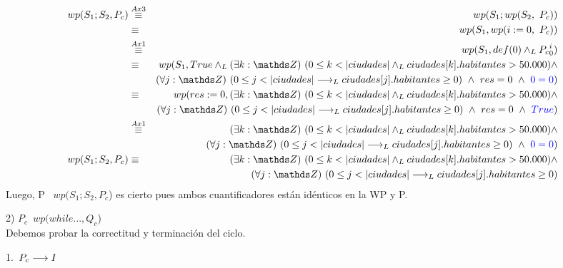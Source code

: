 \documentclass[10pt,a4paper,fleqn]{article}
\begin{document}
\begin{eqnarray}
    wp(S_1;S_2, P_c) &\overset{Ax3}{\equiv}& wp(S_1; wp(S_2,\ P_c))  \notag \\
    &\equiv& wp(S_1, wp(i:=0,\ P_c)) \notag \\
    &\overset{Ax1}{\equiv}& wp(S_1, def(0) \yLuego \text{$P_c$}_{0}^{i}) \notag \\
    &\equiv& wp(S_1, True \yLuego \existe[unalinea]{k}{\ent}{0 \leq k< |ciudades| \yLuego ciudades[k].habitantes >  50.000 }\land \notag \\ & & \paraTodo[unalinea]{j}{\ent}{0\leq j < |ciudades| \implicaLuego ciudades[j].habitantes \geq 0}\ \land \ res=0\ \land \ \textcolor{blue}{0=0}) \notag \\
     &\equiv& wp(res:= 0, \existe[unalinea]{k}{\ent}{0 \leq k< |ciudades| \yLuego ciudades[k].habitantes >  50.000 }\land \notag \\ & & \paraTodo[unalinea]{j}{\ent}{0\leq j < |ciudades| \implicaLuego ciudades[j].habitantes \geq 0}\ \land \ res=0\ \land \ \textcolor{blue}{True}) \notag \\
     &\overset{Ax1}{\equiv}& \existe[unalinea]{k}{\ent}{0 \leq k< |ciudades| \yLuego ciudades[k].habitantes >  50.000 }\land \notag \\ & & \paraTodo[unalinea]{j}{\ent}{0\leq j < |ciudades| \implicaLuego ciudades[j].habitantes \geq 0}\ \land \ \textcolor{blue}{0=0}) \notag \\
       wp(S_1;S_2, P_c) &\equiv& \existe[unalinea]{k}{\ent}{0 \leq k< |ciudades| \yLuego ciudades[k].habitantes >  50.000 }\land \notag \\ & & \paraTodo[unalinea]{j}{\ent}{0\leq j < |ciudades| \implicaLuego ciudades[j].habitantes \geq 0} \notag 
\end{eqnarray}
Luego, P \implica \ $wp(S_1;S_2, P_c$) es cierto pues ambos cuantificadores están idénticos en la WP y P. 

\item 2) $P_c$\implica \ $wp(while...,Q_c$)\\
Debemos probar la correctitud y terminación del ciclo.
\item 1.\ $P_c\longrightarrow I$ \\
\end{document}
